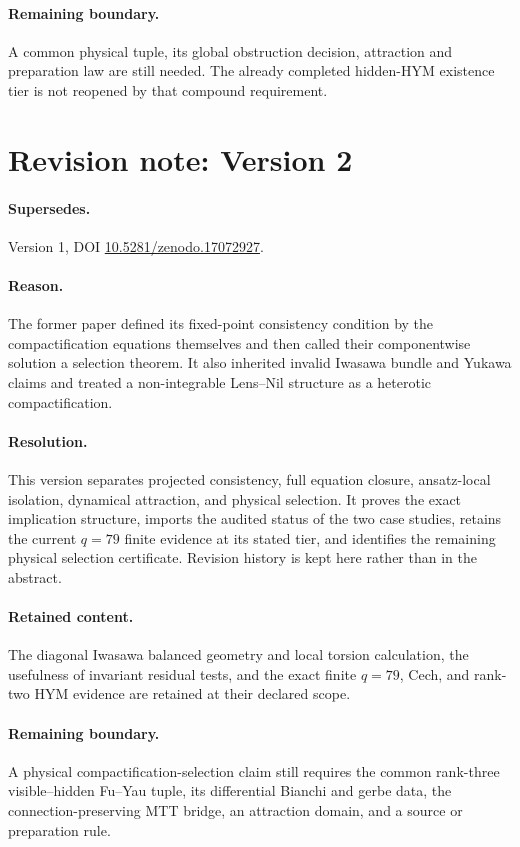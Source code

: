 \documentclass[11pt]{article}
\numberwithin{equation}{section}
\theoremstyle{definition}
\theoremstyle{plain}
\theoremstyle{remark}
\begin{document}
\paragraph{Remaining boundary.}
A common physical tuple, its global obstruction decision, attraction and
preparation law are still needed. The already completed hidden-HYM existence
tier is not reopened by that compound requirement.

\section*{Revision note: Version 2}
\paragraph{Supersedes.} Version 1, DOI
\href{https://doi.org/10.5281/zenodo.17072927}
{10.5281/zenodo.17072927}.

\paragraph{Reason.}  The former paper defined its fixed-point consistency
condition by the compactification equations themselves and then called their
componentwise solution a selection theorem.  It also inherited invalid
Iwasawa bundle and Yukawa claims and treated a non-integrable Lens--Nil
structure as a heterotic compactification.

\paragraph{Resolution.}  This version separates projected consistency, full
equation closure, ansatz-local isolation, dynamical attraction, and physical
selection.  It proves the exact implication structure, imports the audited
status of the two case studies, retains the current \(q=79\) finite evidence
at its stated tier, and identifies the remaining physical selection
certificate.  Revision history is kept here rather than in the abstract.

\paragraph{Retained content.}  The diagonal Iwasawa balanced geometry and
local torsion calculation, the usefulness of invariant residual tests, and
the exact finite \(q=79\), Cech, and rank-two HYM evidence are retained at
their declared scope.

\paragraph{Remaining boundary.}  A physical compactification-selection claim
still requires the common rank-three visible--hidden Fu--Yau tuple, its
differential Bianchi and gerbe data, the connection-preserving MTT bridge, an
attraction domain, and a source or preparation rule.
\end{document}
